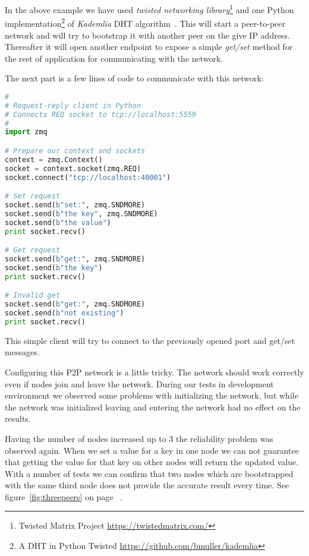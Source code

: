 In the above example we have used 
\textit{twisted networking library}\footnote{Twisted Matrix Project \url{https://twistedmatrix.com/}} and one
Python implementation\footnote{A DHT in Python 
Twisted \url{https://github.com/bmuller/kademlia}} of \textit{Kademlia} DHT algorithm~\cite{KademliaPaper}. 
This will start a peer-to-peer network and will try to bootstrap it with another peer on the give IP address.
Thereafter it will open another endpoint to expose a simple \textit{get/set} method for the rest of
application for communicating with the network.

The next part is a few lines of code to communicate with this network:

\begin{lstlisting}[language=python, caption={Accessing DHT using ZeroMQ REQ/REP sockets}]
#
# Request-reply client in Python
# Connects REQ socket to tcp://localhost:5559
#
import zmq

# Prepare our context and sockets
context = zmq.Context()
socket = context.socket(zmq.REQ)
socket.connect("tcp://localhost:40001")

# Set request
socket.send(b"set:", zmq.SNDMORE)
socket.send(b"the key", zmq.SNDMORE)
socket.send(b"the value")
print socket.recv()

# Get request
socket.send(b"get:", zmq.SNDMORE)
socket.send(b"the key")
print socket.recv()

# Invalid get
socket.send(b"get:", zmq.SNDMORE)
socket.send(b"not existing")
print socket.recv()
\end{lstlisting}

This simple client will try to connect to the previously opened port and get/set messages.

Configuring this P2P network is a little tricky. The network should work correctly even if nodes join
and leave the network. During our tests in development environment we observed some problems with initializing the network,
but while the network was initialized leaving and entering the network had no effect on the results.

Having the number of nodes increased up to 3 the reliability problem was observed again. When we set a value for a key 
in one node we can not guarantee that getting the value for that key on other nodes will return the updated value.
With a number of tests we can confirm that two nodes which are bootstrapped with the same third node does not
provide the accurate result every time. See figure~\ref{fig:threepeers} on page ~\pageref{fig:threepeers}.

